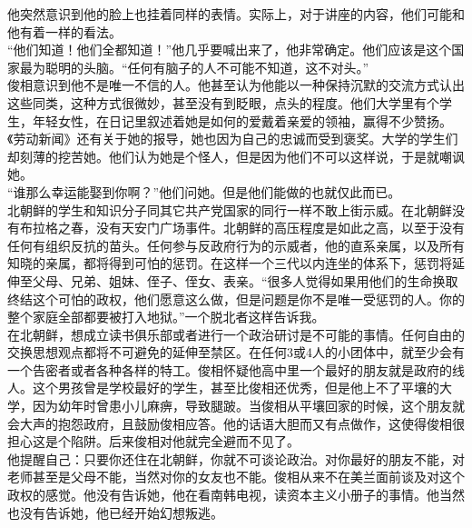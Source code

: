 \begin{multicols}{\theparacolNo}
他突然意识到他的脸上也挂着同样的表情。实际上，对于讲座的内容，他们可能和他有着一样的看法。\\

“他们知道！他们全都知道！”他几乎要喊出来了，他非常确定。他们应该是这个国家最为聪明的头脑。“任何有脑子的人不可能不知道，这不对头。”\\

俊相意识到他不是唯一不信的人。他甚至认为他能以一种保持沉默的交流方式认出这些同类，这种方式很微妙，甚至没有到眨眼，点头的程度。他们大学里有个学生，年轻女性，在日记里叙述着她是如何的爱戴着亲爱的领袖，赢得不少赞扬。《劳动新闻》还有关于她的报导，她也因为自己的忠诚而受到褒奖。大学的学生们却刻薄的挖苦她。他们认为她是个怪人，但是因为他们不可以这样说，于是就嘲讽她。\\

“谁那么幸运能娶到你啊？”他们问她。但是他们能做的也就仅此而已。\\

北朝鲜的学生和知识分子同其它共产党国家的同行一样不敢上街示威。在北朝鲜没有布拉格之春，没有天安门广场事件。北朝鲜的高压程度是如此之高，以至于没有任何有组织反抗的苗头。任何参与反政府行为的示威者，他的直系亲属，以及所有知晓的亲属，都将得到可怕的惩罚。在这样一个三代以内连坐的体系下，惩罚将延伸至父母、兄弟、姐妹、侄子、侄女、表亲。“很多人觉得如果用他们的生命换取终结这个可怕的政权，他们愿意这么做，但是问题是你不是唯一受惩罚的人。你的整个家庭全部都要被打入地狱。”一个脱北者这样告诉我。\\

在北朝鲜，想成立读书俱乐部或者进行一个政治研讨是不可能的事情。任何自由的交换思想观点都将不可避免的延伸至禁区。在任何3或4人的小团体中，就至少会有一个告密者或者各种各样的特工。俊相怀疑他高中里一个最好的朋友就是政府的线人。这个男孩曾是学校最好的学生，甚至比俊相还优秀，但是他上不了平壤的大学，因为幼年时曾患小儿麻痹，导致腿跛。当俊相从平壤回家的时候，这个朋友就会大声的抱怨政府，且鼓励俊相应答。他的话语大胆而又有点做作，这使得俊相很担心这是个陷阱。后来俊相对他就完全避而不见了。\\

他提醒自己：只要你还住在北朝鲜，你就不可谈论政治。对你最好的朋友不能，对老师甚至是父母不能，当然对你的女友也不能。俊相从来不在美兰面前谈及对这个政权的感觉。他没有告诉她，他在看南韩电视，读资本主义小册子的事情。他当然也没有告诉她，他已经开始幻想叛逃。\\
\ifnum{}
	\end{multicols}
\fi